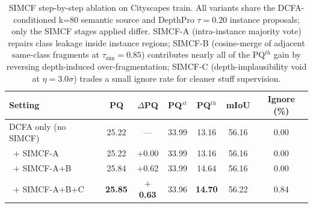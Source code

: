 \begin{table}[t]
\centering
\small
\caption{SIMCF step-by-step ablation on Cityscapes train. All variants share
the DCFA-conditioned k{=}80 semantic source and DepthPro $\tau{=}0.20$ instance
proposals; only the SIMCF stages applied differ. SIMCF-A (intra-instance
majority vote) repairs class leakage inside instance regions; SIMCF-B
(cosine-merge of adjacent same-class fragments at $\tau_\text{sim}{=}0.85$)
contributes nearly all of the PQ$^{th}$ gain by reversing depth-induced
over-fragmentation; SIMCF-C (depth-implausibility void at $\eta{=}3.0\sigma$)
trades a small ignore rate for cleaner stuff supervision.}
\label{tab:simcf-step-ablation}
\begin{tabular}{@{}lcccccc@{}}
\toprule
Setting & PQ & $\Delta$PQ & PQ$^{st}$ & PQ$^{th}$ & mIoU & Ignore (\%) \\
\midrule
DCFA only (no SIMCF)        & 25.22 & ---     & 33.99 & 13.16 & 56.16 & 0.00 \\
\, $+$ SIMCF-A              & 25.22 & $+$0.00 & 33.99 & 13.16 & 56.16 & 0.00 \\
\, $+$ SIMCF-A$+$B          & 25.84 & $+$0.62 & 33.99 & 14.64 & 56.16 & 0.00 \\
\, $+$ SIMCF-A$+$B$+$C      & \textbf{25.85} & \textbf{$+$0.63} & 33.96 & \textbf{14.70} & 56.22 & 0.84 \\
\bottomrule
\end{tabular}
\end{table}
